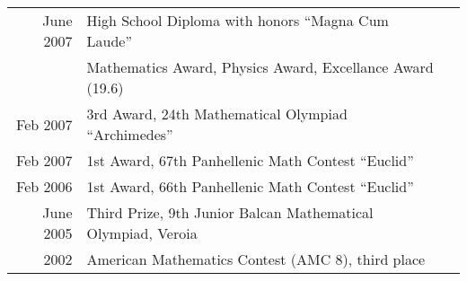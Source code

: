 \documentclass[letterpaper]{deedy-resume} %
\begin{document}
\begin{minipage}[t]{0.66\textwidth}
\begin{tabular}{rll}
  June  2007 &   High  School  Diploma with  honors  “Magna  Cum  Laude”\\
             &   Mathematics Award, Physics Award,  Excellance Award (19.6)\\
  Feb 2007 &  3rd Award, 24th Mathematical Olympiad “Archimedes”\\
  Feb 2007 &  1st Award, 67th Panhellenic Math Contest “Euclid”\\
  Feb 2006 &  1st Award, 66th Panhellenic Math Contest “Euclid”\\
  June 2005 &  Third Prize, 9th Junior Balcan Mathematical Olympiad, Veroia\\
  2002 & American Mathematics Contest (AMC 8), third place\\
  
\end{tabular}

\sectionspace %

%  
%  
%  


\end{minipage} %

\end{document}
